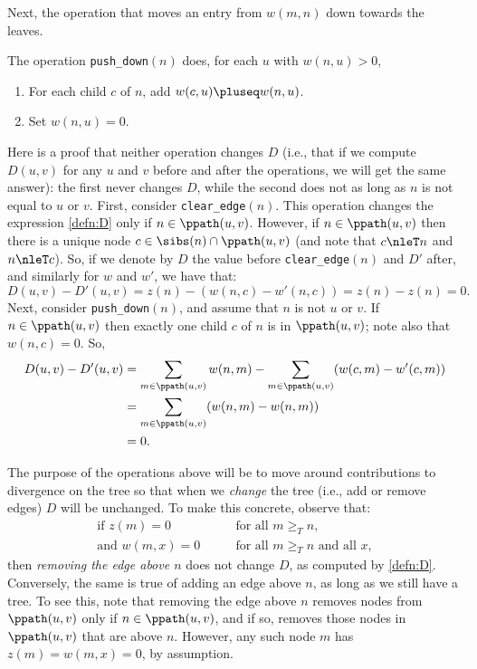 Next, the operation that moves an entry from $w(m, n)$ down towards the leaves.

\begin{definition}
The operation \texttt{push\_down}$(n)$ does,
for each $u$ with $w(n, u) > 0$,
\begin{enumerate}
    \item For each child $c$ of $n$, add $w(c, u) \pluseq w(n, u)$.
    \item Set $w(n, u) = 0$.
\end{enumerate}
\end{definition}

Here is a proof that neither operation changes $D$
(i.e., that if we compute $D(u, v)$ for any $u$ and $v$ before and after the operations,
we will get the same answer):
the first never changes $D$, while the second does not as long as $n$ is not equal to $u$ or $v$.
%
First, consider \texttt{clear\_edge}$(n)$.
%
This operation changes the expression \eqref{defn:D} only if $n \in \ppath(u, v)$.
%
However, if $n \in \ppath(u, v)$ then there is a unique node $c \in \sibs(n) \cap \ppath(u, v)$
(and note that $c \nleT n$ and $n \nleT c$).
%
So, if we denote by $D$ the value before  \texttt{clear\_edge}$(n)$ and $D'$ after,
and similarly for $w$ and $w'$,
we have that:
%
$$
    D(u, v) - D'(u, v)
    =
    z(n)
    -
    (w(n, c) - w'(n, c))
    =
    z(n) - z(n) = 0 .
$$
%
Next, consider \texttt{push\_down}$(n)$, and assume that $n$ is not $u$ or $v$.
%
If $n \in \ppath(u, v)$ then exactly one child $c$ of $n$ is in $\ppath(u, v)$;
note also that $w(n, c) = 0$.
%
So,
\begin{align*}
    D(u, v) - D'(u, v)
    &=
    \sum_{m \in \ppath(u, v)} w(n, m)
    -
    \sum_{m \in \ppath(u, v)} (w(c, m) - w'(c, m)) \\
    &=
    \sum_{m \in \ppath(u, v)} (w(n, m) - w(n, m)) \\
    &= 0.
\end{align*}

The purpose of the operations above will be to move around contributions to divergence on the tree
so that when we \emph{change} the tree (i.e., add or remove edges) $D$ will be unchanged.
%
To make this concrete, observe that:
%
\begin{align}
    \text{if } z(m) = 0 \qquad & \text{for all } m \ge_T n, \\
    \text{and } w(m, x) = 0 \qquad & \text{for all } m \ge_T n \text{ and all } x,
\end{align}
%
then \emph{removing the edge above $n$} does not change $D$,
as computed by \eqref{defn:D}.
%
Conversely, the same is true of adding an edge above $n$, as long as we still have a tree.
%
To see this, note that removing the edge above $n$
removes nodes from $\ppath(u, v)$ only if $n \in \ppath(u, v)$,
and if so, removes those nodes in $\ppath(u, v)$ that are above $n$.
%
However, any such node $m$ has $z(m) = w(m, x) = 0$, by assumption.

